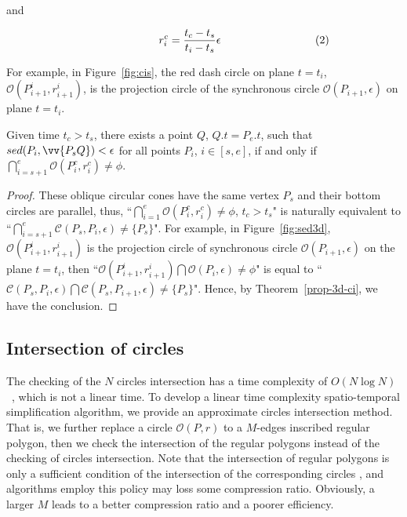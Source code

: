 and

\vspace{-2ex}
\begin{equation*}
\label{equ-proj-circle-r}
    \begin{aligned}
        \hspace{17ex}  r^c_i =\frac{t_c-t_s}{t_i-t_s}{\epsilon}   \hspace{20ex}(2) \\
    \end{aligned}
\end{equation*}
\vspace{-1ex}



For example, in Figure~\ref{fig:cis}, the red dash circle on plane $t=t_i$, \ie $\mathcal{O}(P^i_{i+1}, r^i_{i+1})$, is the projection circle of the synchronous circle $\mathcal{O}(P_{i+1}, \epsilon)$ on plane $t=t_i$.

\vspace{1ex}

\begin{cor}
\label{prop-circle-intersection}
Given time $t_c > t_s$, there exists a point $Q$, $Q.t = P_e.t$, such that $sed(P_i, \vv{P_sQ})<\epsilon$ for all points $P_i$, $i \in [s,e]$, if and only if $\bigcap_{i=s+1}^{e}{\mathcal{O}(P^c_i, r^c_i)} \ne \phi$.
\end{cor}


\begin{proof}
These oblique circular cones have the same vertex $P_s$ and their bottom circles are parallel, thus,
 ``$\bigcap_{i=1}^{e}{\mathcal{O}(P^c_i, r^c_i)} \ne \phi$, $t_c > t_s$" is naturally equivalent to ``$\bigcap_{i=s+1}^{e}{\mathcal{C}(P_s, P_i, \epsilon)} \ne \{P_s\}$".
For example, in Figure~\ref{fig:sed3d}, $\mathcal{O}(P^i_{i+1}, r^i_{i+1})$ is the projection circle of synchronous circle $\mathcal{O}(P_{i+1}, \epsilon)$ on the plane $t=t_i$, then ``${\mathcal{O}(P^i_{i+1}, r^i_{i+1})} \bigcap{\mathcal{O}(P_i, \epsilon)} \ne \phi$" is equal to ``$\mathcal{C}(P_s, P_i, \epsilon) \bigcap {\mathcal{C}(P_s, P_{i+1}, \epsilon)} \ne \{P_s\}$".
Hence, by Theorem~\ref{prop-3d-ci}, we have the conclusion.
\end{proof}


\subsection{Intersection of circles }
The checking of the $N$ circles intersection has a time complexity of \textcolor[rgb]{1.00,0.00,0.00}{${O(N\log N)}$~\cite{Shamos:Circle}}, which is not a linear time.
To develop a linear time complexity spatio-temporal simplification algorithm, we provide an approximate circles intersection method.
That is, we further replace a circle $\mathcal{O}(P, r)$ to a $M$-edges inscribed regular polygon,
then we check the intersection of the regular polygons instead of the checking of circles intersection.
Note that the intersection of regular polygons is only a sufficient condition of the intersection of the corresponding circles , and
algorithms employ this policy may loss some compression ratio. Obviously, a larger $M$ leads to a better compression ratio and a poorer
efficiency.

